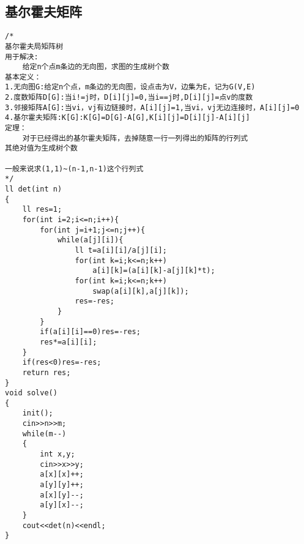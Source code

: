 \documentclass[12pt, a4paper, oneside]{ctexart}
\begin{document}
\subsection{基尔霍夫矩阵} 
\begin{lstlisting}
/*
基尔霍夫局矩阵树
用于解决:
	给定n个点m条边的无向图，求图的生成树个数
基本定义：
1.无向图G:给定n个点，m条边的无向图，设点击为V，边集为E，记为G(V,E)
2.度数矩阵D[G]:当i!=j时，D[i][j]=0,当i==j时,D[i][j]=点v的度数
3.邻接矩阵A[G]:当vi，vj有边链接时，A[i][j]=1,当vi，vj无边连接时，A[i][j]=0
4.基尔霍夫矩阵:K[G]:K[G]=D[G]-A[G],K[i][j]=D[i][j]-A[i][j]
定理：
	对于已经得出的基尔霍夫矩阵，去掉随意一行一列得出的矩阵的行列式
其绝对值为生成树个数

一般来说求(1,1)~(n-1,n-1)这个行列式
*/
ll det(int n)
{
	ll res=1;
	for(int i=2;i<=n;i++){
		for(int j=i+1;j<=n;j++){
			while(a[j][i]){
				ll t=a[i][i]/a[j][i];
				for(int k=i;k<=n;k++)
					a[i][k]=(a[i][k]-a[j][k]*t);
				for(int k=i;k<=n;k++)
					swap(a[i][k],a[j][k]);
				res=-res;
			}
		}
		if(a[i][i]==0)res=-res;
		res*=a[i][i];
	}
	if(res<0)res=-res;
	return res;
}
void solve()
{
	init();
	cin>>n>>m;
	while(m--)
	{
		int x,y;
		cin>>x>>y;
		a[x][x]++;
		a[y][y]++;
		a[x][y]--;
		a[y][x]--;
	}
	cout<<det(n)<<endl;
}
\end{lstlisting}
\end{document}

